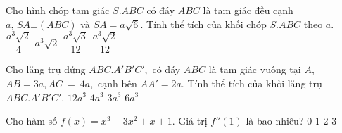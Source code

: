 \begin{ex}%
Cho hình chóp tam giác $ S.ABC $ có đáy $ ABC $ là tam giác đều cạnh $ a, \, SA \bot \left(ABC\right) $ và $ SA = a\sqrt{6} $. Tính thể tích của khối chóp $ S.ABC $ theo $ a. $
	\choice
	{\True $ \dfrac{a^3 \sqrt{2}}{4}  $}
	{$ a^3 \sqrt{2} $}
	{$\dfrac{a^3 \sqrt{3}}{12}  $}
	{$ \dfrac{a^3 \sqrt{2}}{12}  $}
\end{ex}
\begin{ex}%
Cho lăng trụ đứng $ ABC.A'B'C', $ có đáy $ ABC $ là tam giác vuông tại $ A, $ $ AB = 3a, AC~ =~ 4a, $ cạnh bên $ AA' = 2a. $ Tính thể tích của khối lăng trụ $ ABC.A'B'C'. $
	\choice
	{\True $ 12a^3$}
	{$ 4a^3$}
		{$ 3a^3$}
			{$ 6a^3$}
\end{ex}

\begin{ex}%
Cho hàm số $ f \left(x\right) = x^3 - 3x^2 + x + 1. $ Giá trị $ f'' \left(1\right) $ là bao nhiêu?
	\choice
{\True $ 0$}
{$ 1$}
{$ 2$}
{$ 3$}
\end{ex}


